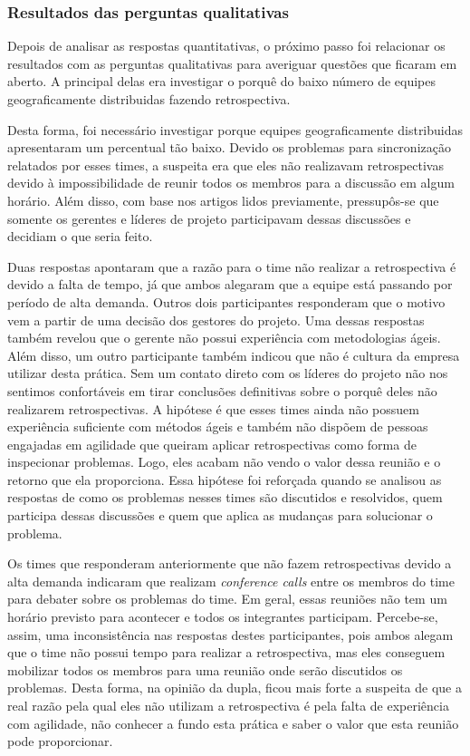 \subsubsection*{Resultados das perguntas qualitativas}

Depois de analisar as respostas quantitativas, o próximo passo foi relacionar os resultados com as perguntas qualitativas para averiguar questões que ficaram em aberto. A principal delas era investigar o porquê do baixo número de equipes geograficamente distribuidas fazendo retrospectiva.
  
Desta forma, foi necessário investigar porque equipes geograficamente distribuidas apresentaram um percentual tão baixo. Devido os problemas para sincronização relatados por esses times, a suspeita era que eles não realizavam retrospectivas devido à impossibilidade de reunir todos os membros para a discussão em algum horário. Além disso, com base nos artigos lidos previamente, pressupôs-se que somente os gerentes e líderes de projeto participavam dessas discussões e decidiam o que seria feito.

Duas respostas apontaram que a razão para o time não realizar a retrospectiva é devido a falta de tempo, já que ambos alegaram que a equipe está passando por período de alta demanda. Outros dois participantes responderam que o motivo vem a partir de uma decisão dos gestores do projeto. Uma dessas respostas também revelou que o gerente não possui experiência com metodologias ágeis. Além disso, um outro participante também indicou que não é cultura da empresa utilizar desta prática. Sem um contato direto com os líderes do projeto não nos sentimos confortáveis em tirar conclusões definitivas sobre o porquê deles não realizarem retrospectivas. A hipótese é que esses times ainda não possuem experiência suficiente com métodos ágeis e também não dispõem de pessoas engajadas em agilidade que queiram aplicar retrospectivas como forma de inspecionar problemas. Logo, eles acabam não vendo o valor dessa reunião e o retorno que ela proporciona. Essa hipótese foi reforçada quando se analisou as respostas de como os problemas nesses times são discutidos e resolvidos, quem participa dessas discussões e quem que aplica as mudanças para solucionar o problema.

Os times que responderam anteriormente que não fazem retrospectivas devido a alta demanda indicaram que realizam \textit{conference calls} entre os membros do time para debater sobre os problemas do time. Em geral, essas reuniões não tem um horário previsto para acontecer e todos os integrantes participam. Percebe-se, assim, uma inconsistência nas respostas destes participantes, pois ambos alegam que o time não possui tempo para realizar a retrospectiva, mas eles conseguem mobilizar todos os membros para uma reunião onde serão discutidos os problemas. Desta forma, na opinião da dupla, ficou mais forte a suspeita de que a real razão pela qual eles não utilizam a retrospectiva é pela falta de experiência com agilidade, não conhecer a fundo esta prática e saber o valor que esta reunião pode proporcionar.

